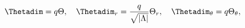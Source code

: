\begin{equation}
\Thetadim = q \Theta, \quad \Thetadim_r = \frac{q}{\sqrt{|\Lambda|}}
\Theta_r, \quad \Thetadim_\theta  = q\Theta_\theta ,
\end{equation}

